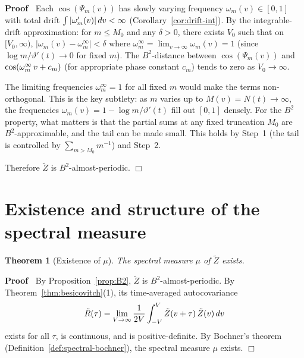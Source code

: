 \documentclass{article}
\newcommand{\tmtextbf}[1]{\text{{\bfseries{#1}}}}
\newenvironment{proof}{\noindent\textbf{Proof\ }}{\hspace*{\fill}$\Box$\medskip}
\newtheorem{theorem}{Theorem}
\begin{document}
\begin{proof}
  \tmtextbf{Step 3: Frequency freezing.} Each $\cos (\Psi_m (v))$ has slowly
  varying frequency $\omega_m (v) \in [0, 1]$ with total drift $\int |
  \omega_m' (v) |  \hspace{0.17em} dv < \infty$
  (Corollary~\ref{cor:drift-int}). By the integrable-drift approximation: for
  $m \le M_0$ and any $\delta > 0$, there exists $V_0$ such that on $[V_0,
  \infty)$, $| \omega_m (v) - \omega_m^{\infty} | < \delta$ where
  $\omega_m^{\infty} = \lim_{v \to \infty} \omega_m (v) = 1$ (since $\log m /
  \vartheta' (t) \to 0$ for fixed $m$). The $B^2$-distance between $\cos
  (\Psi_m (v))$ and $\cos (\omega_m^{\infty}  \hspace{0.17em} v + c_m)$ (for
  appropriate phase constant $c_m$) tends to zero as $V_0 \to \infty$.
  
  The limiting frequencies $\omega_m^{\infty} = 1$ for all fixed $m$ would
  make the terms non-orthogonal. This is the key subtlety: as $m$ varies up to
  $M (v) = N (t) \to \infty$, the frequencies $\omega_m (v) = 1 - \log m /
  \vartheta' (t)$ fill out $[0, 1]$ densely. For the $B^2$ property, what
  matters is that the partial sums at any fixed truncation $M_0$ are
  $B^2$-approximable, and the tail can be made small. This holds by Step~1
  (the tail is controlled by $\sum_{m > M_0} m^{- 1}$) and Step~2.
  
  Therefore $\tilde{Z}$ is $B^2$-almost-periodic.
\end{proof}

\section{Existence and structure of the spectral measure}\label{sec:existence}

\begin{theorem}
  [Existence of $\mu$]\label{thm:existence} The spectral measure $\mu$ of
  $\tilde{Z}$ exists.
\end{theorem}

\begin{proof}
  By Proposition~\ref{prop:B2}, $\tilde{Z}$ is $B^2$-almost-periodic. By
  Theorem~\ref{thm:besicovitch}(1), its time-averaged autocovariance
  \[ \tilde{R} (\tau) = \lim_{V \to \infty}  \frac{1}{2 V}  \int_{- V}^V
     \tilde{Z}  (v + \tau)  \hspace{0.17em} \tilde{Z} (v)  \hspace{0.17em} dv
  \]
  exists for all $\tau$, is continuous, and is positive-definite. By Bochner's
  theorem (Definition~\ref{def:spectral-bochner}), the spectral measure $\mu$
  exists.
\end{proof}
\end{document}
